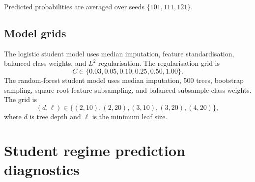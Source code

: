 Predicted probabilities are averaged over seeds \(\{101,111,121\}\).

\subsection{Model grids}

The logistic student model uses median imputation, feature standardisation, balanced class weights, and \(L^2\) regularisation. The regularisation grid is
\begin{equation}
C\in\{0.03,0.05,0.10,0.25,0.50,1.00\}.
\end{equation}
The random-forest student model uses median imputation, 500 trees, bootstrap sampling, square-root feature subsampling, and balanced subsample class weights. The grid is
\begin{equation}
(d,\ell)\in
\{(2,10),(2,20),(3,10),(3,20),(4,20)\},
\end{equation}
where \(d\) is tree depth and \(\ell\) is the minimum leaf size.

\section{Student regime prediction diagnostics}
\label{app:student-regime-prediction-diagnostics}

